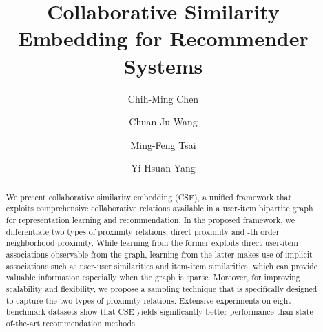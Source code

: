 \documentclass[sigconf,anonymous=false]{acmart}
\begin{document}
\title{Collaborative Similarity Embedding for Recommender Systems}
\author{Chih-Ming Chen}

\author{Chuan-Ju Wang}

\author{Ming-Feng Tsai}

\author{Yi-Hsuan Yang}











\begin{abstract}
We present collaborative similarity embedding (CSE), a unified framework that
exploits comprehensive collaborative relations available in a user-item
bipartite graph for representation learning and recommendation.
In the proposed framework, we differentiate two types of proximity relations:
direct proximity and -th order neighborhood proximity.
While learning from the former exploits direct user-item associations
observable from the graph, learning from the latter makes use of implicit
associations such as user-user similarities and item-item similarities, which
can provide valuable information especially when the graph is sparse.
Moreover, for improving scalability and flexibility, we propose a sampling
technique that is specifically designed to capture the two types of proximity
relations.
Extensive experiments on eight benchmark datasets show that CSE yields
significantly better performance than state-of-the-art recommendation
methods.
\end{abstract}



\maketitle
\end{document}

